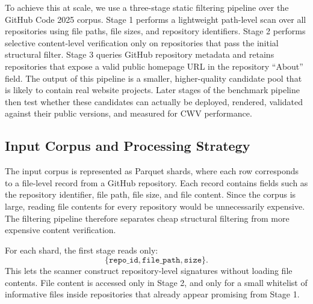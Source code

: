 To achieve this at scale, we use a three-stage static filtering pipeline over the GitHub Code 2025 corpus. Stage 1 performs a lightweight path-level scan over all repositories using file paths, file sizes, and repository identifiers. Stage 2 performs selective content-level verification only on repositories that pass the initial structural filter. Stage 3 queries GitHub repository metadata and retains repositories that expose a valid public homepage URL in the repository ``About'' field. The output of this pipeline is a smaller, higher-quality candidate pool that is likely to contain real website projects. Later stages of the benchmark pipeline then test whether these candidates can actually be deployed, rendered, validated against their public versions, and measured for CWV performance.

\subsection{Input Corpus and Processing Strategy}

The input corpus is represented as Parquet shards, where each row corresponds to a file-level record from a GitHub repository. Each record contains fields such as the repository identifier, file path, file size, and file content. Since the corpus is large, reading file contents for every repository would be unnecessarily expensive. The filtering pipeline therefore separates cheap structural filtering from more expensive content verification.

For each shard, the first stage reads only:
\[
\{\texttt{repo\_id}, \texttt{file\_path}, \texttt{size}\}.
\]
This lets the scanner construct repository-level signatures without loading file contents. File content is accessed only in Stage 2, and only for a small whitelist of informative files inside repositories that already appear promising from Stage 1.


